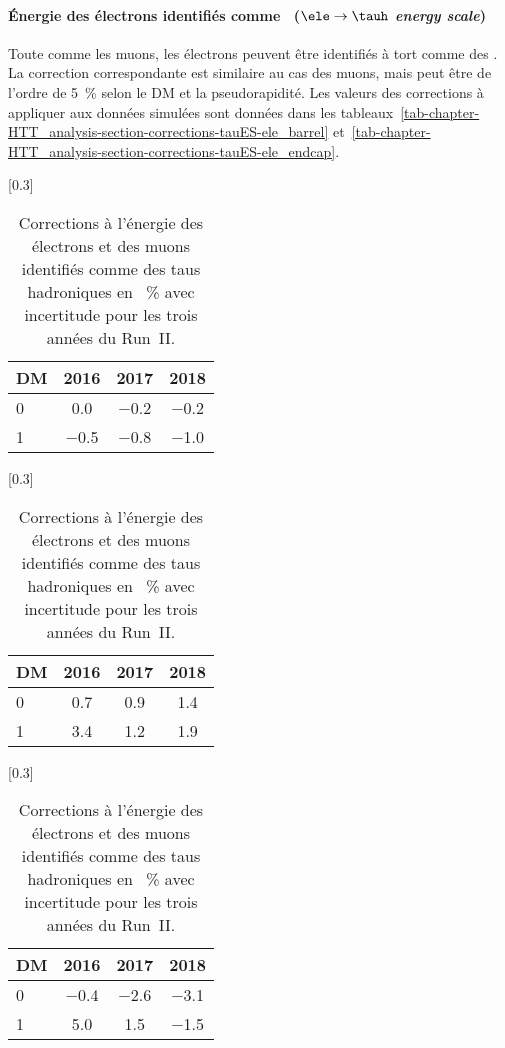 \paragraph{Énergie des électrons identifiés comme \tauh\ (\emph{$\ele\to\tauh$ energy scale})}
Toute comme les muons, les électrons peuvent être identifiés à tort comme des \tauh.
La correction correspondante est similaire au cas des muons, mais peut être de l'ordre de \SI{5}{\%} selon le DM et la pseudorapidité.
Les valeurs des corrections à appliquer aux données simulées sont données dans les tableaux~\ref{tab-chapter-HTT_analysis-section-corrections-tauES-ele_barrel} et~\ref{tab-chapter-HTT_analysis-section-corrections-tauES-ele_endcap}.
\begin{table}[h]
\centering
{}[0.3\textwidth]
{\begin{tabular}{lccc}
\toprule
DM & 2016 & 2017 & 2018\\
\midrule
0 & \num{0.0} & \num{-0.2} & \num{-0.2} \\
1 & \num{-0.5} & \num{-0.8} & \num{-1.0} \\
\bottomrule
\end{tabular}}
\hfill
{}[0.3\textwidth]
{\begin{tabular}{lccc}
\toprule
DM & 2016 & 2017 & 2018\\
\midrule
0 & \num{0.7} & \num{0.9} & \num{1.4} \\
1 & \num{3.4} & \num{1.2} & \num{1.9} \\
\bottomrule
\end{tabular}}
\hfill
{}[0.3\textwidth]
{\begin{tabular}{lccc}
\toprule
DM & 2016 & 2017 & 2018\\
\midrule
0 & \num{-0.4} & \num{-2.6} & \num{-3.1} \\
1 & \num{5.0} & \num{1.5} & \num{-1.5} \\
\bottomrule
\end{tabular}}
\caption[Corrections à l'énergie des leptons identifiés comme des taus hadroniques.]{Corrections à l'énergie des électrons et des muons identifiés comme des taus hadroniques en \SI{}{\%} avec incertitude pour les trois années du Run~II.}
\label{tab-chapter-HTT_analysis-section-corrections-tauES-leptons}
\end{table}
